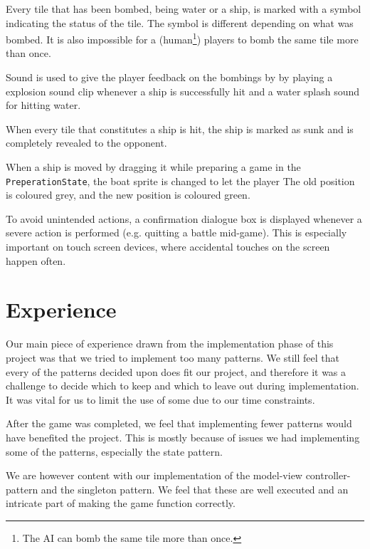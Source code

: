 Every tile that has been bombed, being water or a ship, is marked with a symbol indicating the status of the tile. The symbol is different depending on what was bombed. It is also impossible for a (human\footnote{The AI can bomb the same tile more than once.}) players to bomb the same tile more than once.

Sound is used to give the player feedback on the bombings by by playing a explosion sound clip whenever a ship is successfully hit and a water splash sound for hitting water.

When every tile that constitutes a ship is hit, the ship is marked as sunk and is completely revealed to the opponent.

When a ship is moved by dragging it while preparing a game in the \texttt{PreperationState}, the boat sprite is changed to let the player
The old position is coloured grey, and the new position is coloured green.

To avoid unintended actions, a confirmation dialogue box is displayed whenever a severe action is performed (e.g. quitting a battle mid-game). This is especially important on touch screen devices, where accidental touches on the screen happen often.


\section{Experience} %
Our main piece of experience drawn from the implementation phase of this project was that we tried to implement too many patterns. We still feel that every of the patterns decided upon does fit our project, and therefore it was a challenge to decide which to keep and which to leave out during implementation. It was vital for us to limit the use of some due to our time constraints. %

After the game was completed, we feel that implementing fewer patterns would have benefited the project. This is mostly because of issues we had implementing some of the patterns, especially the state pattern.%

We are however content with our implementation of the model-view controller-pattern and the singleton pattern. We feel that these are well executed and an intricate part of making the game function correctly.

